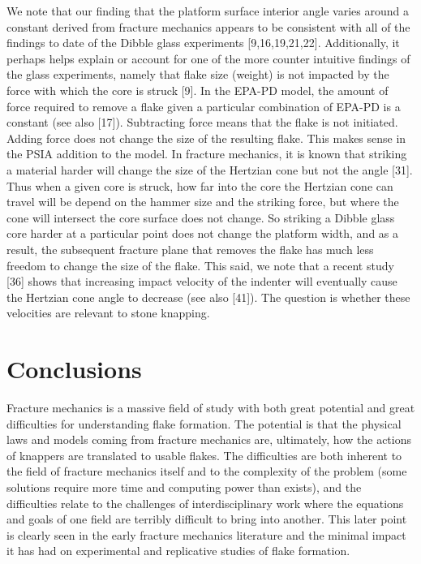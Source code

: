 \documentclass[10pt,letterpaper]{article}
\begin{document}
We note that our finding that the platform surface interior angle varies
around a constant derived from fracture mechanics appears to be
consistent with all of the findings to date of the Dibble glass
experiments {[}9,16,19,21,22{]}. Additionally, it perhaps helps explain
or account for one of the more counter intuitive findings of the glass
experiments, namely that flake size (weight) is not impacted by the
force with which the core is struck {[}9{]}. In the EPA-PD model, the
amount of force required to remove a flake given a particular
combination of EPA-PD is a constant (see also {[}17{]}). Subtracting
force means that the flake is not initiated. Adding force does not
change the size of the resulting flake. This makes sense in the PSIA
addition to the model. In fracture mechanics, it is known that striking
a material harder will change the size of the Hertzian cone but not the
angle {[}31{]}. Thus when a given core is struck, how far into the core
the Hertzian cone can travel will be depend on the hammer size and the
striking force, but where the cone will intersect the core surface does
not change. So striking a Dibble glass core harder at a particular point
does not change the platform width, and as a result, the subsequent
fracture plane that removes the flake has much less freedom to change
the size of the flake. This said, we note that a recent study {[}36{]}
shows that increasing impact velocity of the indenter will eventually
cause the Hertzian cone angle to decrease (see also {[}41{]}). The
question is whether these velocities are relevant to stone knapping.

\hypertarget{conclusions}{%
\section{Conclusions}\label{conclusions}}

Fracture mechanics is a massive field of study with both great potential
and great difficulties for understanding flake formation. The potential
is that the physical laws and models coming from fracture mechanics are,
ultimately, how the actions of knappers are translated to usable flakes.
The difficulties are both inherent to the field of fracture mechanics
itself and to the complexity of the problem (some solutions require more
time and computing power than exists), and the difficulties relate to
the challenges of interdisciplinary work where the equations and goals
of one field are terribly difficult to bring into another. This later
point is clearly seen in the early fracture mechanics literature and the
minimal impact it has had on experimental and replicative studies of
flake formation.
\end{document}
